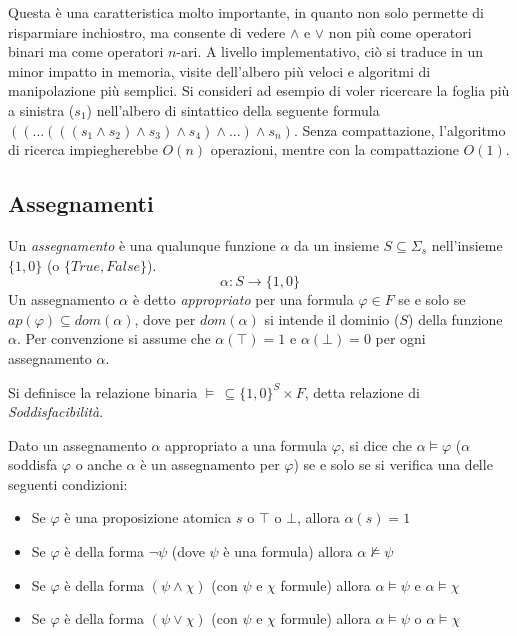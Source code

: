 \documentclass[./main.tex]{subfiles}
\begin{document}
Questa è una caratteristica molto importante, in quanto non solo permette di risparmiare inchiostro, ma consente di vedere
$\land$ e $\lor$ non più come operatori binari ma come operatori $n$-ari. A livello implementativo, ciò si traduce in un minor
impatto in memoria, visite dell'albero più veloci e algoritmi di manipolazione più semplici. Si consideri ad esempio di voler ricercare la 
foglia più a sinistra ($s_1$) nell'albero di sintattico della seguente formula $(( ... (((s_1 \land s_2) \land s_3) \land s_4) \land ... )\land s_n)$.
Senza compattazione, l'algoritmo di ricerca impiegherebbe $O(n)$ operazioni, mentre con la compattazione $O(1)$.




\subsection{Assegnamenti} \label{sec:assegnamenti}

Un \textit{assegnamento} è una qualunque funzione $\alpha$ da un 
insieme $S \subseteq \Sigma_s$ nell'insieme $\{1, 0\}$ (o $\{True, False\}$).
$$ \alpha : S \rightarrow \{1, 0\} $$
Un assegnamento $\alpha$ è detto \textit{appropriato}  per una formula $\varphi \in F$ se e solo se $ap(\varphi) \subseteq dom(\alpha)$,
dove per $dom(\alpha)$ si intende il dominio ($S$) della funzione $\alpha$.
Per convenzione si assume che $\alpha(\top) = 1$ e $\alpha(\bot) = 0$ per ogni assegnamento $\alpha$.

Si definisce la relazione binaria $\models \, \subseteq \{1, 0\}^{S} \times F$, detta relazione di \textit{Soddisfacibilità}. 

Dato un assegnamento $\alpha$ appropriato a una formula $\varphi$, si dice che $\alpha \models \varphi$ ($\alpha$ soddisfa $\varphi$ 
o anche $\alpha$ è un assegnamento per $\varphi$) se e solo se si verifica una delle seguenti condizioni:
\begin{itemize}
  \item Se $\varphi$ è una proposizione atomica $s$ o $\top$ o $\bot$, allora $\alpha(s) = 1$
  \item Se $\varphi$ è della forma $\lnot \psi$ (dove $\psi$ è una formula) allora $\alpha \not\models \psi$
  \item Se $\varphi$ è della forma $(\psi \land \chi)$ (con $\psi$ e $\chi$ formule) allora $\alpha \models \psi$ e $\alpha \models \chi$
  \item Se $\varphi$ è della forma $(\psi \lor \chi)$ (con $\psi$ e $\chi$ formule) allora  $\alpha \models \psi$ o $\alpha \models \chi$
\end{itemize}
\end{document}
